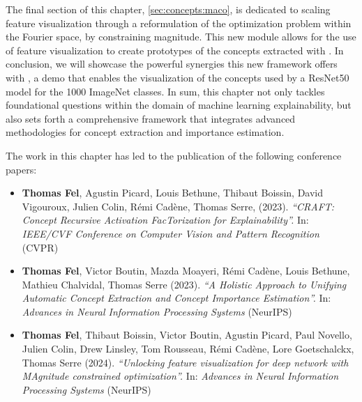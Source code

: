 \begin{chapterabstract}
{The final section of this chapter, \autoref{sec:concepts:maco}, is dedicated to scaling feature visualization through a reformulation of the optimization problem within the Fourier space, by constraining magnitude. This new module allows for the use of feature visualization to create prototypes of the concepts extracted with \craft.
In conclusion, we will showcase the powerful synergies this new framework offers with \Lens, a demo that enables the visualization of the concepts used by a ResNet50 model for the 1000 ImageNet classes.
In sum, this chapter not only tackles foundational questions within the domain of machine learning explainability, but also sets forth a comprehensive framework that integrates advanced methodologies for concept extraction and importance estimation.
}
\end{chapterabstract}

The work in this chapter has led to the publication of the following conference papers:
{\small{
\begin{itemize}

    \item \textbf{Thomas Fel}\equal, Agustin Picard\equal, Louis Bethune\equal, Thibaut Boissin\equal, David Vigouroux, Julien Colin, Rémi Cadène, Thomas Serre, (2023). \textit{``CRAFT: Concept Recursive Activation FacTorization for Explainability''.} In: \textit{IEEE/CVF Conference on Computer Vision and Pattern Recognition} (\textcolor{confcolor}{CVPR})
    
    \item \textbf{Thomas Fel}\equal, Victor Boutin\equal, Mazda Moayeri, Rémi Cadène, Louis Bethune, Mathieu Chalvidal, Thomas Serre (2023). \textit{``A Holistic Approach to Unifying Automatic Concept Extraction and Concept Importance Estimation''.} In: \textit{Advances in Neural Information Processing Systems}  (\textcolor{confcolor}{NeurIPS})
    
    \item \textbf{Thomas Fel}\equal, Thibaut Boissin\equal, Victor Boutin\equal, Agustin Picard\equal, Paul Novello\equal, Julien Colin, Drew Linsley, Tom Rousseau, Rémi Cadène, Lore Goetschalckx, Thomas Serre (2024). \textit{``Unlocking feature visualization for deep network with MAgnitude constrained optimization''.} In: \textit{Advances in Neural Information Processing Systems}  (\textcolor{confcolor}{NeurIPS})

\end{itemize}
}}

\minitoc
\clearpage

